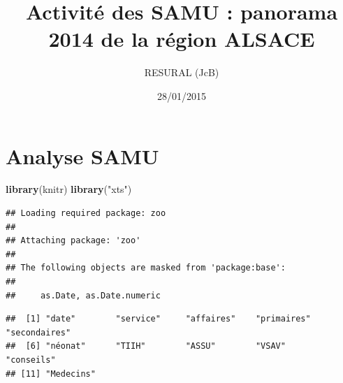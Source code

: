 \documentclass[]{article}
\title{Activité des SAMU : panorama 2014 de la région ALSACE}
\author{RESURAL (JcB)}
\date{28/01/2015}
\newenvironment{Shaded}{\begin{snugshade}}{\end{snugshade}}
\newcommand{\KeywordTok}[1]{\textcolor[rgb]{0.13,0.29,0.53}{\textbf{{#1}}}}
\newcommand{\DataTypeTok}[1]{\textcolor[rgb]{0.13,0.29,0.53}{{#1}}}
\newcommand{\DecValTok}[1]{\textcolor[rgb]{0.00,0.00,0.81}{{#1}}}
\newcommand{\StringTok}[1]{\textcolor[rgb]{0.31,0.60,0.02}{{#1}}}
\newcommand{\CommentTok}[1]{\textcolor[rgb]{0.56,0.35,0.01}{\textit{{#1}}}}
\newcommand{\NormalTok}[1]{{#1}}
\begin{document}
\maketitle


{
\hypersetup{linkcolor=black}
\setcounter{tocdepth}{3}
\tableofcontents
}
\section{Analyse SAMU}\label{analyse-samu}

\begin{Shaded}
\begin{Highlighting}[]
\KeywordTok{library}\NormalTok{(knitr)}
\KeywordTok{library}\NormalTok{(}\StringTok{"xts"}\NormalTok{)}
\end{Highlighting}
\end{Shaded}

\begin{verbatim}
## Loading required package: zoo
## 
## Attaching package: 'zoo'
## 
## The following objects are masked from 'package:base':
## 
##     as.Date, as.Date.numeric
\end{verbatim}

\begin{Shaded}
\end{Shaded}

\begin{verbatim}
##  [1] "date"        "service"     "affaires"    "primaires"   "secondaires"
##  [6] "néonat"      "TIIH"        "ASSU"        "VSAV"        "conseils"   
## [11] "Medecins"
\end{verbatim}
\end{document}
